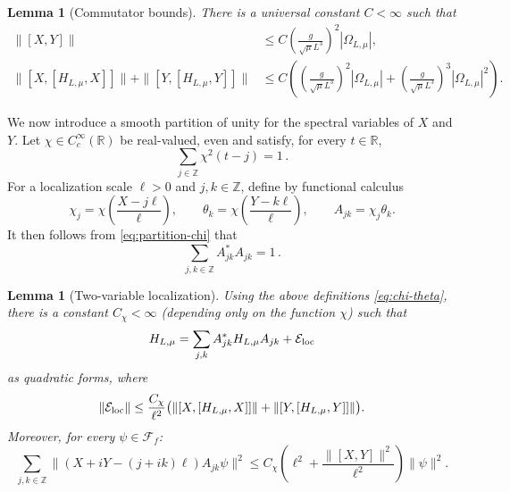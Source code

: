 \documentclass[11pt]{amsart}
\newtheorem{lemma}[definition]{Lemma}
\theoremstyle{definition}
\numberwithin{equation}{section}
\newcommand{\R}{\mathbb R}
\newcommand{\Z}{\mathbb Z}
\newcommand{\1}{\mathbf 1}
\begin{document}
 
\begin{lemma}[Commutator bounds]\label{lem:commutators}
There is a universal constant \(C<\infty\) such that
\begin{align}
 \|[X,Y]\|
 &\le C\left(\frac{g}{\sqrt{\mu}L^3} \right)^2|\Omega_{L, \mu}|,
 \label{eq:XY-commutator}\\
 \|[X,[H_{L,\mu},X]]\|
 +\|[Y,[H_{L,\mu},Y]]\|
 &\le C\left(\left(\frac{g}{\sqrt{\mu}L^3} \right)^2|\Omega_{L, \mu}|+\left(\frac{g}{\sqrt{\mu}L^3} \right)^3|\Omega_{L, \mu}|^2\right).
 \label{eq:double-commutator}
\end{align}
\end{lemma}
We now introduce a smooth partition of unity for the spectral variables of $X$ and $Y$. Let $\chi\in C_c^\infty(\R)$ be real-valued, even and satisfy, for every $t\in\mathbb R$,
\begin{equation}\label{eq:partition-chi}
 \sum_{j\in\Z}\chi^2(t-j)=1\,.
\end{equation}
For a localization scale $\ell>0$ and $j,k\in\Z$, define by functional calculus
\begin{equation}\label{eq:chi-theta}
 \chi_j=\chi\left(\frac{X-j\ell}{\ell}\right),\qquad
 \theta_k=\chi\left(\frac{Y-k\ell}{\ell}\right),\qquad
 A_{jk}=\chi_j\theta_k.
\end{equation}
It then follows from \eqref{eq:partition-chi} that
\begin{equation}\label{eq:partition-A}
 \sum_{j,k\in\Z}A_{jk}^*A_{jk} = 1\,. 
\end{equation}

\begin{lemma}[Two-variable localization]\label{lem:abstract-localization}
Using the above definitions \eqref{eq:chi-theta}, there is a constant $C_\chi<\infty$ (depending only on the function $\chi$) such that
\begin{equation}\label{eq:IMS-general}
 H_{L, \mu}=\sum_{j,k}A_{jk}^*H_{L, \mu}A_{jk}+\mathcal{E}_{\rm loc}
\end{equation}
as quadratic forms, where
\begin{equation}\label{eq:Eloc-bound-general}
 \|\mathcal{E}_{\rm loc}\|
 \le \frac{C_\chi}{\ell^2}
 \bigl(\|[X,[H_{L, \mu},X]]\|+\|[Y,[H_{L, \mu}, Y]]\|\bigr).
\end{equation}
Moreover, for every $\psi \in \mathcal{F}_f$:
\begin{equation}\label{eq:Zlocal-general}
 \sum_{j,k \in \Z}\|(X+iY-(j+ik)\ell)A_{jk}\psi\|^2
 \le C_\chi\left(\ell^2+\frac{\|[X,Y]\|^2}{\ell^2}\right)\|\psi\|^2.
\end{equation}
\end{lemma}
\end{document}
